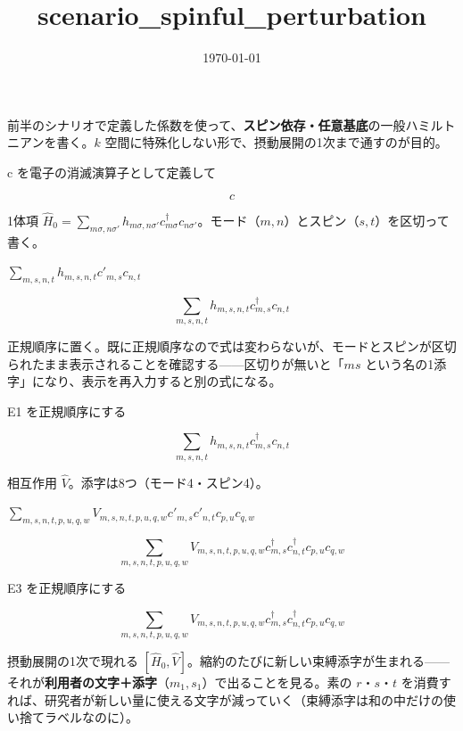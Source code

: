 \documentclass[dvipdfmx,a4paper,11pt]{jsarticle}
\title{scenario\_spinful\_perturbation}
\date{\today}
\begin{document}
\maketitle

前半のシナリオで定義した係数を使って、\textbf{スピン依存・任意基底}の一般ハミルトニアンを書く。$k$ 空間に特殊化しない形で、摂動展開の1次まで通すのが目的。

c を電子の消滅演算子として定義して

\[
  c
\]

1体項 $\hat H_0=\sum_{m\sigma,n\sigma'} h_{m\sigma,n\sigma'} c^\dagger_{m\sigma}c_{n\sigma'}$。モード（$m,n$）とスピン（$s,t$）を区切って書く。

$\sum_{m,s,n,t} h_{m,s,n,t} c'_{m,s} c_{n,t}$

\begin{equation}
  \sum_{m,s,n,t} h_{m,s,n,t} c^{\dagger}_{m,s} c_{n,t}
  \label{eq:E1}
\end{equation}

正規順序に置く。既に正規順序なので式は変わらないが、モードとスピンが区切られたまま表示されることを確認する——区切りが無いと「$ms$ という名の1添字」になり、表示を再入力すると別の式になる。

E1 を正規順序にする

\begin{equation}
  \sum_{m,s,n,t} h_{m,s,n,t} {c}_{m,s}^{\dagger} {c}_{n,t}
  \label{eq:E2}
\end{equation}

相互作用 $\hat V$。添字は8つ（モード4・スピン4）。

$\sum_{m,s,n,t,p,u,q,w} V_{m,s,n,t,p,u,q,w} c'_{m,s} c'_{n,t} c_{p,u} c_{q,w}$

\begin{equation}
  \sum_{m,s,n,t,p,u,q,w} V_{m,s,n,t,p,u,q,w} c^{\dagger}_{m,s} c^{\dagger}_{n,t} c_{p,u} c_{q,w}
  \label{eq:E3}
\end{equation}

E3 を正規順序にする

\begin{equation}
  \sum_{m,s,n,t,p,u,q,w} V_{m,s,n,t,p,u,q,w} {c}_{m,s}^{\dagger} {c}_{n,t}^{\dagger} {c}_{p,u} {c}_{q,w}
  \label{eq:E4}
\end{equation}

摂動展開の1次で現れる $[\hat H_0,\hat V]$。縮約のたびに新しい束縛添字が生まれる——それが\textbf{利用者の文字＋添字}（$m_1,s_1$）で出ることを見る。素の $r$・$s$・$t$ を消費すれば、研究者が新しい量に使える文字が減っていく（束縛添字は和の中だけの使い捨てラベルなのに）。
\end{document}
